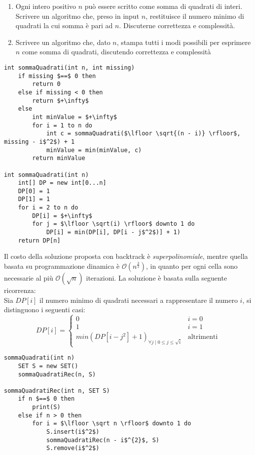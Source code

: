 \documentclass[../cheatSheetAlgoritmi.tex]{subfiles}
\begin{document}
\begin{enumerate}
	\item Ogni intero positivo $n$ può essere scritto come somma di quadrati di interi. Scrivere un algoritmo che, preso in input $n$, restituisce il numero minimo di quadrati la cui somma è pari ad $n$. Discuterne correttezza e complessità.
	\item Scrivere un algoritmo che, dato $n$, stampa tutti i modi possibili per esprimere $n$ come somma di quadrati, discutendo correttezza e complessità
\end{enumerate}
\begin{lstlisting}[caption=Somma di Quadrati - Conteggio]
int sommaQuadrati(int n, int missing)
    if missing $==$ 0 then
        return 0
    else if missing < 0 then
        return $+\infty$
    else
        int minValue = $+\infty$
        for i = 1 to n do 
            int c = sommaQuadrati($\lfloor \sqrt{(n - i)} \rfloor$, missing - i$^2$) + 1
            minValue = min(minValue, c)
        return minValue

int sommaQuadrati(int n)
    int[] DP = new int[0...n]
    DP[0] = 1
    DP[1] = 1
    for i = 2 to n do
        DP[i] = $+\infty$
        for j = $\lfloor \sqrt(i) \rfloor$ downto 1 do
            DP[i] = min(DP[i], DP[i - j$^2$)] + 1)
    return DP[n]
\end{lstlisting}
Il costo della soluzione proposta con backtrack è \emph{superpolinomiale}, mentre quella basata su programmazione dinamica è $\mathcal{O}(n^\frac{3}{2})$, in quanto per ogni cella sono necessarie al più $\mathcal{O}(\sqrt n)$ iterazioni. La soluzione è basata sulla seguente ricorrenza: \\
Sia $DP[i]$ il numero minimo di quadrati necessari a rappresentare il numero $i$, si distinguono i seguenti casi:
\begin{equation*}
    DP[i]=\begin{cases}
        0 & \text{$i = 0$}\\
        1 & \text{$i = 1$}\\
        min(DP[i - j^2] + 1)_{\forall j \mid 0 \leq j \leq \sqrt i} & \text{altrimenti} 
    \end{cases}
\end{equation*}
\begin{lstlisting}[caption= Somma di Quadrati - Elenco Insiemi]
sommaQuadrati(int n)
	SET S = new SET()
	sommaQuadratiRec(n, S)
	
sommaQuadratiRec(int n, SET S)
	if n $==$ 0 then
		print(S)
	else if n > 0 then
		for i = $\lfloor \sqrt n \rfloor$ downto 1 do
			S.insert(i$^2$)
			sommaQuadratiRec(n - i$^{2}$, S)
			S.remove(i$^2$)	
\end{lstlisting}
\end{document}
